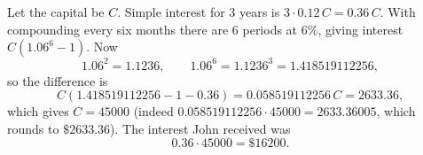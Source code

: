 Let the capital be $C$. Simple interest for $3$ years is $3\cdot0.12\,C=0.36\,C$. With compounding every six months there are $6$ periods at $6\%$, giving interest $C\left(1.06^6-1\right)$. Now
\[1.06^2=1.1236,\qquad 1.06^6=1.1236^3=1.418519112256,\]
so the difference is
\[C\left(1.418519112256-1-0.36\right)=0.058519112256\,C=2633.36,\]
which gives $C=45000$ (indeed $0.058519112256\cdot45000=2633.36005$, which rounds to $\$2633.36$). The interest John received was
\[0.36\cdot45000=\boxed{\$16200}.\]
